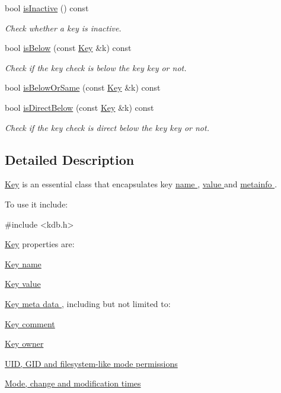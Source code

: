 \begin{DoxyCompactItemize}
bool \hyperlink{classkdb_1_1Key_adcd75cc13e9d766eaac72beb7d748bdb}{is\+Inactive} () const 
\begin{DoxyCompactList}\small\item\em Check whether a key is inactive. \end{DoxyCompactList}\item 
bool \hyperlink{classkdb_1_1Key_a493893308d5b4c54d646cc0df5a076ae}{is\+Below} (const \hyperlink{classkdb_1_1Key}{Key} \&k) const 
\begin{DoxyCompactList}\small\item\em Check if the key check is below the key key or not. \end{DoxyCompactList}\item 
bool \hyperlink{classkdb_1_1Key_a0d4d2d50f9e3624ade560b0f74267d86}{is\+Below\+Or\+Same} (const \hyperlink{classkdb_1_1Key}{Key} \&k) const 
\item 
bool \hyperlink{classkdb_1_1Key_a3cc66b309bd42e67d7bc0e4234aa76a1}{is\+Direct\+Below} (const \hyperlink{classkdb_1_1Key}{Key} \&k) const 
\begin{DoxyCompactList}\small\item\em Check if the key check is direct below the key key or not. \end{DoxyCompactList}\end{DoxyCompactItemize}


\subsection{Detailed Description}
\hyperlink{classkdb_1_1Key}{Key} is an essential class that encapsulates key \hyperlink{group__keyname}{name }, \hyperlink{group__keyvalue}{value } and \hyperlink{group__keymeta}{metainfo }. 

To use it include\+: 
\begin{DoxyCode}
\textcolor{preprocessor}{#include <kdb.h>}
\end{DoxyCode}


\hyperlink{classkdb_1_1Key}{Key} properties are\+:
\begin{DoxyItemize}
\item \hyperlink{group__keyname}{Key name }
\item \hyperlink{group__keyvalue}{Key value }
\item \hyperlink{group__keymeta}{Key meta data }, including but not limited to\+:
\begin{DoxyItemize}
\item \hyperlink{group__meta_gafb89735689929ff717cc9f2d0d0b46a2}{Key comment }
\item \hyperlink{group__meta_ga35922a017bee8b4bcb493bbdfad9d6f5}{Key owner }
\item \hyperlink{group__keymeta}{U\+I\+D, G\+I\+D and filesystem-\/like mode permissions }
\item \hyperlink{group__keymeta}{Mode, change and modification times }
\end{DoxyItemize}
\end{DoxyItemize}

